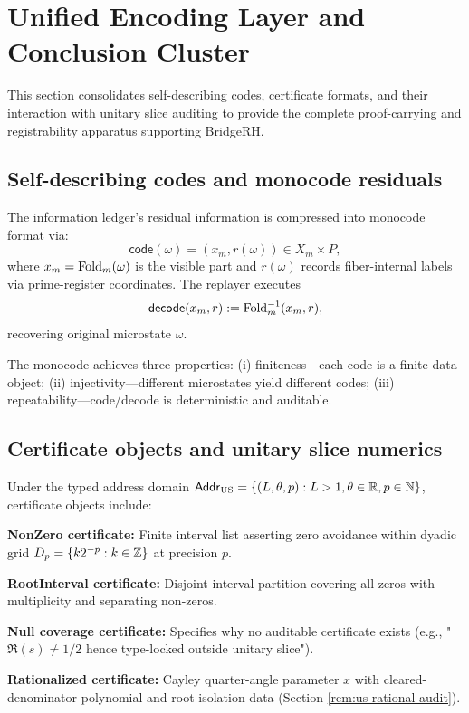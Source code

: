 \section{Unified Encoding Layer and Conclusion Cluster}\label{sec:conclusion-cluster}

This section consolidates self-describing codes, certificate formats, and their interaction with unitary slice auditing to provide the complete proof-carrying and registrability apparatus supporting BridgeRH.

\subsection{Self-describing codes and monocode residuals}
\begin{definition}\label{def:monocode}
The information ledger's residual information is compressed into monocode format via:
$$
\mathsf{code}(\omega)=(x_m,r(\omega))\in X_m\times P,
$$
where $x_m=\mathrm{Fold}_m(\omega)$ is the visible part and $r(\omega)$ records fiber-internal labels via prime-register coordinates. The replayer executes
$$
\mathsf{decode}(x_m,r):=\mathrm{Fold}_m^{-1}(x_m,r),
$$
recovering original microstate $\omega$.
\end{definition}

The monocode achieves three properties: (i) finiteness—each code is a finite data object; (ii) injectivity—different microstates yield different codes; (iii) repeatability—code/decode is deterministic and auditable.

\subsection{Certificate objects and unitary slice numerics}
\begin{definition}\label{def:us-cert-types}
Under the typed address domain $\mathsf{Addr}_{\mathrm{US}}=\{(L,\theta,p):L>1,\theta\in\mathbb{R},p\in\mathbb{N}\}$, certificate objects include:

\noindent\textbf{NonZero certificate:} Finite interval list  asserting zero avoidance within dyadic grid $D_p=\{k2^{-p}:k\in\mathbb{Z}\}$ at precision $p$.\par

\noindent\textbf{RootInterval certificate:} Disjoint interval partition covering all zeros with multiplicity and separating non-zeros.\par

\noindent\textbf{Null coverage certificate:} Specifies why no auditable certificate exists (e.g., "$\Re(s)\neq 1/2$ hence type-locked outside unitary slice").\par

\noindent\textbf{Rationalized certificate:} Cayley quarter-angle parameter $x$ with cleared-denominator polynomial and root isolation data (Section \ref{rem:us-rational-audit}).
\end{definition}

